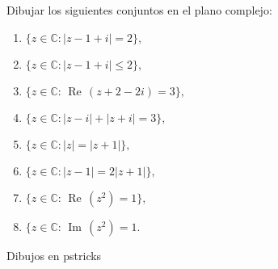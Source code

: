 \documentclass[twoside]{book}
\renewcommand{\Re}{\,\operatorname{Re}\,}
\renewcommand{\Im}{\,\operatorname{Im}\,}
\begin{document}
\begin{example}{}
    Dibujar los siguientes conjuntos en el plano complejo:
    \begin{multicols}{2}
        \begin{enumerate}[label=\alph*).]
            \item $\{z\in\mathbb{C}:|z-1+i|=2\},$
            \item $\{z\in\mathbb{C}:|z-1+i|\leq2\},$
            \item $\{z\in\mathbb{C}:\Re(z+2-2i)=3\},$
            \item $\{z\in\mathbb{C}:|z-i|+|z+i|=3\},$
            \item $\{z\in\mathbb{C}:|z|=|z+1|\},$
            \item $\{z\in\mathbb{C}:|z-1|=2|z+1|\},$
            \item $\{z\in\mathbb{C}:\Re(z^2)=1\},$
            \item $\{z\in\mathbb{C}:\Im(z^2)=1.$
        \end{enumerate}
    \end{multicols}

\end{example}
\begin{sol}
    \begin{solucion}{}
        Dibujos en pstricks
    \end{solucion}
\end{sol}
\end{document}
